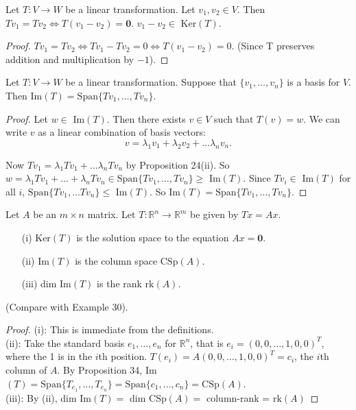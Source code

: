 \documentclass[10pt]{scrartcl}
\begin{document}
\begin{proposition} Let $T : V \to W$ be a linear transformation. Let $v_1, v_2 \in V$. Then $Tv_1 = Tv_2 \iff T(v_1 -v_2) = \mathbf{0}$. $v_1 - v_2 \in $ Ker$(T)$.	
\end{proposition}


\begin{proof}
$Tv_1 = Tv_2 \iff Tv_1 - Tv_2 = 0 \iff T(v_1 - v_2) = 0$. (Since T preserves addition and multiplication by $-1$). 
\end{proof} \vspace{10pt}

\begin{proposition} Let $T: V \to W$ be a linear transformation. Suppose that $\{v_1, \dots, v_n\}$ is a basis for $V$. Then Im$(T) = \text{Span}\{Tv_1, \dots, Tv_n\}$.	
\end{proposition}


\begin{proof}
Let $w \in $ Im$(T)$. Then there exists $v \in V$ such that $T(v) = w$. We can write $v$ as a linear combination of basis vectors:\[v = \lambda_1v_1 + \lambda_2v_2 + \dots \lambda_nv_n. \]

Now $Tv_1 = \lambda_1 Tv_1 + \dots \lambda_n Tv_n$ by Proposition 24(ii). So $w = \lambda_1Tv_1 + \dots + \lambda_nTv_n \in \text{Span}\{Tv_1, \dots, Tv_n\} \geq $ Im$(T)$. Since $Tv_i \in $ Im$(T)$ for all $i$, $\text{Span}\{Tv_1, \dots Tv_n\} \leq $ Im$(T)$. So Im$(T) = \text{Span}\{Tv_1, \dots, Tv_n\}.$
 \end{proof}
\vspace{10pt}

 
\begin{proposition}{\normalfont {}} Let $A$ be an $m \times n$ matrix. Let $T: \mathbb{R}^n \to \mathbb{R}^m$ be given by $Tx = Ax$. \begin{enumerate}
 \item[(i)] Ker$(T)$ is the solution space to the equation $Ax = \mathbf{0}$. 
 \item[(ii)] Im$(T)$ is the column space $\text{CSp}(A)$.
 \item[(iii)] dim Im$(T)$ is the rank $\text{rk}(A)$.
 \end{enumerate}
 
 (Compare with Example 30).
  \end{proposition}

 
 \begin{proof}
 (i): This is immediate from the definitions. \\
 
 (ii): Take the standard basis $e_1,\dots,e_n$ for $\mathbb{R}^n$, that is $e_i = (0,0,\dots,1,0,0)^T$, where the 1 is in the $i$th position. $T(e_i) = A(0,0,\dots,1,0,0)^T = c_i$, the $i$th column of $A$. By Proposition 34, Im$(T) = \text{Span}\{T_{e_1},\dots,T_{e_n}\} = \text{Span}\{c_1,\dots,c_n\} = \text{CSp}(A)$.\\
 
 (iii): By (ii), dim Im$(T) = $ dim $\text{CSp}(A) =$ column-rank = $\text{rk}(A)$
 \end{proof}\vspace*{10pt}
\end{document}
